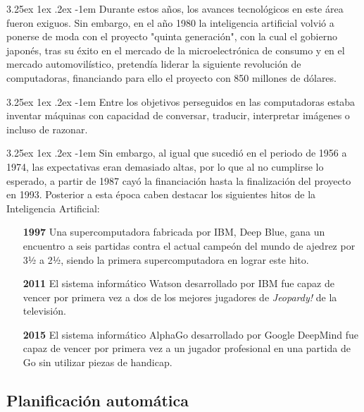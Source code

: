 \documentclass{article}
\makeatletter
\renewcommand\paragraph{\@startsection{paragraph}{5}{\z@}%
  {3.25ex \@plus1ex \@minus.2ex}%
  {-1em}%
  {\normalfont\normalsize\bfseries}}
\makeatother
\begin{document}
\paragraph{}
Durante estos años, los avances tecnológicos en este área fueron exiguos. Sin embargo, en el año 1980 la inteligencia artificial volvió a ponerse de moda con el proyecto "quinta generación", con la cual el gobierno japonés, tras su éxito en el mercado de la microelectrónica de consumo y en el mercado automovilístico, pretendía liderar la siguiente revolución de computadoras, financiando para ello el proyecto con 850 millones de dólares.

\paragraph{}
Entre los objetivos perseguidos en las computadoras estaba inventar máquinas con capacidad de conversar, traducir, interpretar imágenes o incluso de razonar.

\paragraph{}
Sin embargo, al igual que sucedió en el periodo de 1956 a 1974, las expectativas eran demasiado altas, por lo que al no cumplirse lo esperado, a partir de 1987 cayó la financiación hasta la finalización del proyecto en 1993. Posterior a esta época caben destacar los siguientes hitos de la Inteligencia Artificial:

\begin{itemize}
    \item[\textbf{1997}] Una supercomputadora fabricada por IBM, Deep Blue, gana un encuentro a seis partidas contra el actual campeón del mundo de ajedrez por 3½ a 2½, siendo la primera supercomputadora en lograr este hito\cite{deepBlue}.
    \item[\textbf{2011}] El sistema informático Watson desarrollado por IBM fue capaz de vencer por primera vez a dos de los mejores jugadores de \textit{Jeopardy!} de la televisión\cite{jeopardy}.
    \item[\textbf{2015}] El sistema informático AlphaGo desarrollado por Google DeepMind fue capaz de vencer por primera vez a un jugador profesional en una partida de Go sin utilizar piezas de handicap\cite{go}.
\end{itemize}

    \subsection{Planificación automática}
    
\end{document}

